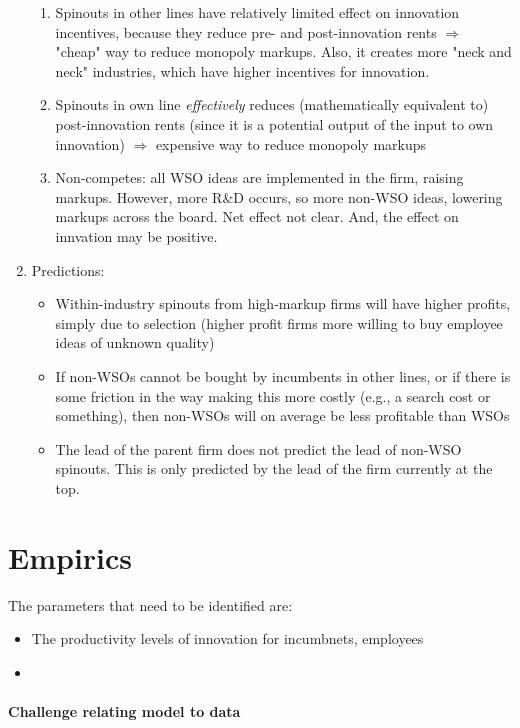 \documentclass[12pt,english]{article}
\theoremstyle{remark}
\begin{document}
\begin{enumerate}
\begin{enumerate}
		\item Spinouts in other lines have relatively limited effect on innovation incentives, because they reduce pre- and post-innovation rents $\Rightarrow$ "cheap" way to reduce monopoly markups. Also, it creates more "neck and neck" industries, which have higher incentives for innovation. 
		\item Spinouts in own line \textit{effectively} reduces (mathematically equivalent to) post-innovation rents (since it is a potential output of the input to own innovation) $\Rightarrow$ expensive way to reduce monopoly markups
		\item Non-competes: all WSO ideas are implemented in the firm, raising markups. However, more R\&D occurs, so more non-WSO ideas, lowering markups across the board. Net effect not clear. And, the effect on innvation may be positive. 
	\end{enumerate}
	\item Predictions:
	\begin{itemize}
		\item Within-industry spinouts from high-markup firms will have higher profits, simply due to selection (higher profit firms more willing to buy employee ideas of unknown quality)
		\item If non-WSOs cannot be bought by incumbents in other lines, or if there is some friction in the way making this more costly (e.g., a search cost or something), then non-WSOs will on average be less profitable than WSOs
		\item The lead of the parent firm does not predict the lead of non-WSO spinouts. This is only predicted by the lead of the firm currently at the top. 
	\end{itemize}
\end{enumerate}

\section{Empirics}

The parameters that need to be identified are:

\begin{itemize}
	\item The productivity levels of innovation for incumbnets, employees
	\item 
\end{itemize}

\paragraph{Challenge relating model to data}
\end{document}
